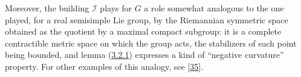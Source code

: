 \documentclass[12pt,a4paper,oneside,english]{smfart}
\newcommand{\btref}[1]{\hyperlink{bt:#1}{#1}}
\newcommand{\btbib}[1]{\hyperlink{bib:#1}{#1}}
\theoremstyle{definition}
\theoremstyle{bt}
\begin{document}
\begingroup\providecommand{\imm}{}
\renewcommand{\imm}{\mathscr{I}}
\providecommand{\borno}{}
\renewcommand{\borno}{\mathscr{B}}
\providecommand{\Bfr}{}
\renewcommand{\Bfr}{\mathfrak{B}}
\providecommand{\Bfrh}{}
\renewcommand{\Bfrh}{\widehat{\mathfrak{B}}}
\providecommand{\Cfr}{}
\renewcommand{\Cfr}{\mathfrak{C}}
\providecommand{\Gh}{}
\renewcommand{\Gh}{\widehat{G}}
\providecommand{\Bh}{}
\renewcommand{\Bh}{\widehat{B}}
\providecommand{\Nh}{}
\renewcommand{\Nh}{\widehat{N}}
\providecommand{\Hh}{}
\renewcommand{\Hh}{\widehat{H}}
\providecommand{\Ph}{}
\renewcommand{\Ph}{\widehat{P}}
\providecommand{\Wh}{}
\renewcommand{\Wh}{\widehat{\mathbf{W}}}
\providecommand{\Vh}{}
\renewcommand{\Vh}{\widehat{\mathbf{V}}}
\providecommand{\nuh}{}
\renewcommand{\nuh}{\widehat{\nu}}
\providecommand{\bA}{}
\renewcommand{\bA}{\mathbf{A}}
\providecommand{\bW}{}
\renewcommand{\bW}{\mathbf{W}}
\providecommand{\bV}{}
\renewcommand{\bV}{\mathbf{V}}
\providecommand{\bS}{}
\renewcommand{\bS}{\mathbf{S}}
\providecommand{\bC}{}
\renewcommand{\bC}{\mathbf{C}}
\providecommand{\bD}{}
\renewcommand{\bD}{\mathbf{D}}
\providecommand{\bSig}{}
\renewcommand{\bSig}{\mathbf{\Sigma}}
\providecommand{\vp}{}
\renewcommand{\vp}[1]{{}^{v}\!#1}
\providecommand{\dgr}{}
\renewcommand{\dgr}{\dagger}
\providecommand{\dle}{}
\renewcommand{\dle}{\leqslant_{\bD}}
\providecommand{\Stab}{}\renewcommand{\Stab}{\operatorname{Stab}}
\providecommand{\cl}{}\renewcommand{\cl}{\operatorname{cl}}
\providecommand{\Card}{}\renewcommand{\Card}{\operatorname{Card}}
\providecommand{\Cox}{}\renewcommand{\Cox}{\operatorname{Cox}}
\providecommand{\Aut}{}\renewcommand{\Aut}{\operatorname{Aut}}
\providecommand{\Ker}{}\renewcommand{\Ker}{\operatorname{Ker}}
\providecommand{\Id}{}\renewcommand{\Id}{\operatorname{Id}}
\newenvironment{state}[2]%
  {\par\medskip\noindent\textit{#1 \textup{(#2)}}. --- \begingroup\itshape}%
  {\endgroup\par\medskip}
\newenvironment{states}[1]%
  {\par\medskip\noindent\textit{#1}. --- \begingroup\itshape}%
  {\endgroup\par\medskip}
\providecommand{\num}{}
\renewcommand{\num}[1]{\par\medskip\noindent\textbf{(#1)}\ \ignorespaces}
\setlength{\parskip}{2pt}
\bigskip

\noindent
Moreover, the building $\imm$ plays for $G$ a role somewhat analogous to the
one played, for a real semisimple Lie group, by the Riemannian symmetric
space obtained as the quotient by a maximal compact subgroup: it is a
complete contractible metric space on which the group acts, the stabilizers
of each point being bounded, and lemma (\btref{3.2.1}) expresses a kind of
``negative curvature'' property. For other examples of this analogy, see
[\btbib{35}].
\end{document}
